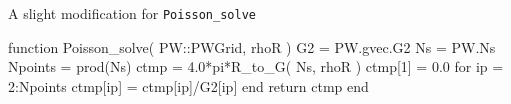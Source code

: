 A slight modification for {\tt Poisson\_solve}

\begin{juliacode}
function Poisson_solve( PW::PWGrid, rhoR )
  G2 = PW.gvec.G2
  Ns = PW.Ns
  Npoints = prod(Ns)
  ctmp = 4.0*pi*R_to_G( Ns, rhoR )
  ctmp[1] = 0.0
  for ip = 2:Npoints
    ctmp[ip] = ctmp[ip]/G2[ip]
  end
  return ctmp
end
\end{juliacode}
